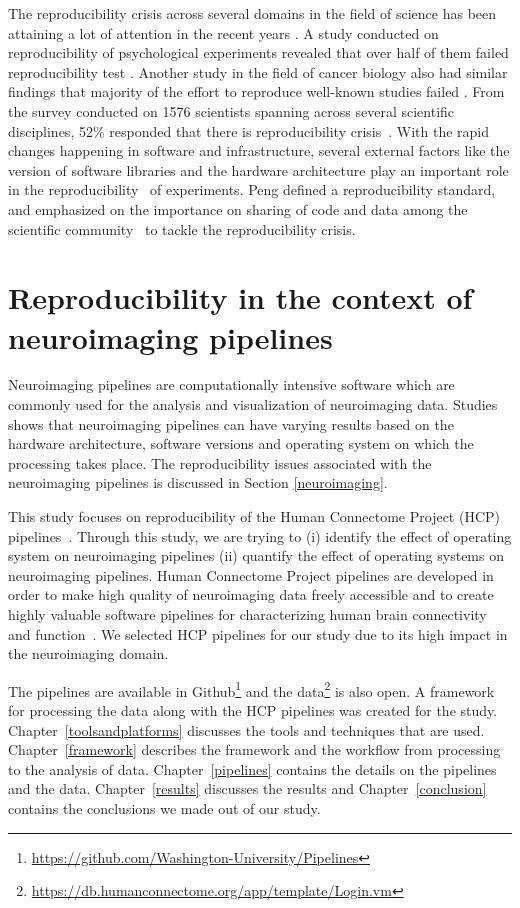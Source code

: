 The reproducibility crisis across several domains in the field of 
science has been attaining a lot of attention in the recent years 
\cite{aac4716,Begley2012,Button2013,Baker2016,Gla15}. 
A study conducted on reproducibility of psychological experiments 
revealed that over half of them failed reproducibility test 
\cite{aac4716}. Another study in the field of cancer biology also had 
similar findings that majority of the effort to reproduce well-known 
studies failed \cite{Begley2012}. From the survey conducted on 1576 
scientists spanning across several scientific disciplines, 52\% 
responded that there is reproducibility crisis~\cite{Nature_survey}. With the rapid changes 
happening in software and infrastructure, several external factors like 
the version of software libraries and the hardware architecture play
an important role in the 
reproducibility~\cite{10.1371/journal.pone.0038234,Gla15} of 
experiments. Peng defined a reproducibility standard, and emphasized on 
the importance on sharing of code and data among the scientific 
community~\cite{Peng2011} to tackle the reproducibility  crisis.

\section{Reproducibility in the context of neuroimaging pipelines}
Neuroimaging pipelines are computationally intensive software which are 
commonly used for the analysis and visualization of neuroimaging data. 
Studies~\cite{10.1371/journal.pone.0038234,Gla15} shows that 
neuroimaging pipelines can have varying results based on the hardware 
architecture, software versions and operating system on which the 
processing takes place. The reproducibility issues associated with the 
neuroimaging pipelines is discussed in Section \ref{neuroimaging}.

This study focuses on reproducibility of the Human Connectome Project (HCP) pipelines~\cite{Gla13}. 
Through this study, we are trying to (i) identify the effect of operating system on neuroimaging pipelines (ii) quantify the effect of operating systems on neuroimaging pipelines. 
Human Connectome Project pipelines are developed in order to make high quality of neuroimaging data freely accessible and to create highly valuable software pipelines for characterizing human brain connectivity and function~\cite{VanEssen2013}. 
We selected HCP pipelines for our study due to its high impact in the neuroimaging domain.

The pipelines are available in 
Github\footnote{\url{https://github.com/Washington-University/Pipelines}} 
and the data\footnote{\url{https://db.humanconnectome.org/app/template/Login.vm}} 
is also open. A framework for processing the data along with the HCP 
pipelines was created for the study. Chapter~\ref{toolsandplatforms} 
discusses the tools and techniques that are used. 
Chapter~\ref{framework} describes the framework and the workflow from 
processing to the analysis of data. Chapter~\ref{pipelines} contains 
the details on the pipelines and the data. Chapter~\ref{results} 
discusses the results and Chapter~\ref{conclusion} contains the 
conclusions we made out of our study.

